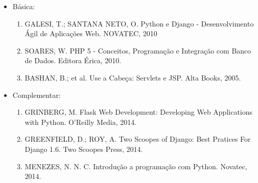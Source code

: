 \begin{itemize} 

\item Básica:
    \begin{enumerate}

    \item GALESI, T.; SANTANA NETO, O.
          Python e Django - Desenvolvimento Ágil de Aplicações Web.
          NOVATEC, 2010

    \item SOARES, W.
          PHP 5 - Conceitos, Programação e Integração com Banco de Dados.
          Editora Érica, 2010.
    
    \item BASHAN, B.; et al.
          Use a Cabeça: Servlets e JSP.
          Alta Books, 2005.
    

	
    \end{enumerate}

\item Complementar:
	\begin{enumerate} 

    \item GRINBERG, M.
          Flask Web Development: Developing Web Applications with Python.
          O'Reilly Media, 2014.

    \item GREENFIELD, D.; ROY, A.
          Two Scoopes of Django: Best Pratices For Django 1.6.
          Two Scoopes Press, 2014.

    \item MENEZES, N. N. C.
          Introdução a programação com Python.
          Novatec, 2014.

	\end{enumerate}

\end{itemize}



